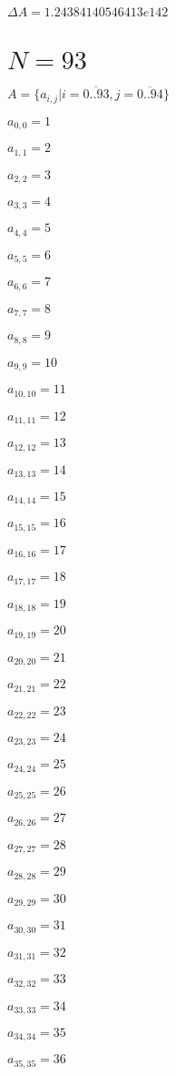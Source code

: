 \documentclass[a4paper,12pt]{article}
\begin{document}
$\Delta A = 1.24384140546413e142$



\section{ $N = 93$ }
$A = \{ a _{ i, j } | i = \overline { 0..93 }, j = \overline { 0..94 } \}$

$a _{ 0, 0 } = 1$

$a _{ 1, 1 } = 2$

$a _{ 2, 2 } = 3$

$a _{ 3, 3 } = 4$

$a _{ 4, 4 } = 5$

$a _{ 5, 5 } = 6$

$a _{ 6, 6 } = 7$

$a _{ 7, 7 } = 8$

$a _{ 8, 8 } = 9$

$a _{ 9, 9 } = 10$

$a _{ 10, 10 } = 11$

$a _{ 11, 11 } = 12$

$a _{ 12, 12 } = 13$

$a _{ 13, 13 } = 14$

$a _{ 14, 14 } = 15$

$a _{ 15, 15 } = 16$

$a _{ 16, 16 } = 17$

$a _{ 17, 17 } = 18$

$a _{ 18, 18 } = 19$

$a _{ 19, 19 } = 20$

$a _{ 20, 20 } = 21$

$a _{ 21, 21 } = 22$

$a _{ 22, 22 } = 23$

$a _{ 23, 23 } = 24$

$a _{ 24, 24 } = 25$

$a _{ 25, 25 } = 26$

$a _{ 26, 26 } = 27$

$a _{ 27, 27 } = 28$

$a _{ 28, 28 } = 29$

$a _{ 29, 29 } = 30$

$a _{ 30, 30 } = 31$

$a _{ 31, 31 } = 32$

$a _{ 32, 32 } = 33$

$a _{ 33, 33 } = 34$

$a _{ 34, 34 } = 35$

$a _{ 35, 35 } = 36$
\end{document}
